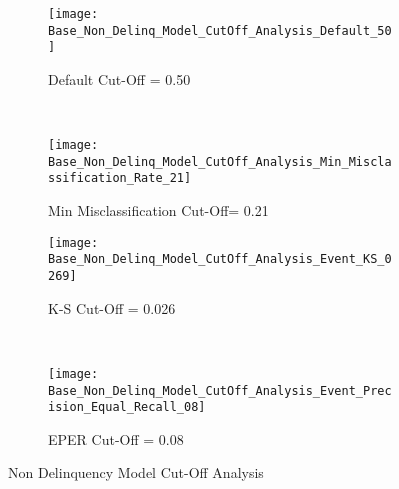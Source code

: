 \begin{figure}[H]
	\centering
	\begin{subfigure}[b]{ 0.45\textwidth}
		\captionsetup{font=scriptsize}
		\texttt{[image: Base\_Non\_Delinq\_Model\_CutOff\_Analysis\_Default\_50]}\caption{Default Cut-Off = 0.50}\label{fig:Base_Non_Delinq_Model_CutOff_Analysis_Default_50}
	\end{subfigure}  ~\quad
	\begin{subfigure}[b]{0.45\textwidth}
		\captionsetup{font=scriptsize}
		\texttt{[image: Base\_Non\_Delinq\_Model\_CutOff\_Analysis\_Min\_Misclassification\_Rate\_21]}
		\caption{Min Misclassification Cut-Off= 0.21}\label{fig:Base_Non_Delinq_Model_CutOff_Analysis_Min_Misclassification_Rate_17}
	\end{subfigure} 
	\medskip \newline
	\begin{subfigure}[b]{0.45\textwidth}
		\captionsetup{font=scriptsize}
		\texttt{[image: Base\_Non\_Delinq\_Model\_CutOff\_Analysis\_Event\_KS\_0269]}
		\caption{K-S Cut-Off = 0.026}\label{fig:Base_Non_Delinq_Model_CutOff_Analysis_Event_KS_026}
	\end{subfigure} ~\quad
	\begin{subfigure}[b]{0.45\textwidth}
		\captionsetup{font=scriptsize}
		\texttt{[image: Base\_Non\_Delinq\_Model\_CutOff\_Analysis\_Event\_Precision\_Equal\_Recall\_08]}
		\caption{EPER Cut-Off = 0.08}\label{fig:Base_Non_Delinq_Model_CutOff_Analysis_Event_Precision_Equal_Recall_09}
	\end{subfigure}
	\caption{Non Delinquency Model Cut-Off Analysis}
	\label{fig:NonDelinquencyModelCutOffAnalysis}
\end{figure}

